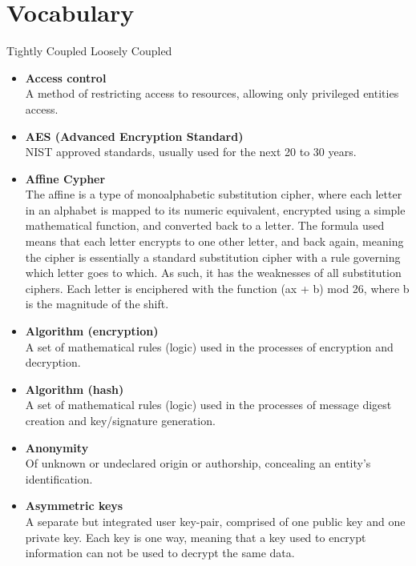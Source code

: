\newpage
\section{Vocabulary}

Tightly Coupled
Loosely Coupled

\begin{itemize}
\item \textbf{Access control}\\
A method of restricting access to resources, allowing only privileged entities access.

\item \textbf{AES (Advanced Encryption Standard)}\\
NIST approved standards, usually used for the next 20 to 30 years.

\item \textbf{Affine Cypher}\\
The affine is a type of monoalphabetic substitution cipher, where each letter in an alphabet is mapped to its numeric equivalent, encrypted using a simple mathematical function, and converted back to a letter. The formula used means that each letter encrypts to one other letter, and back again, meaning the cipher is essentially a standard substitution cipher with a rule governing which letter goes to which. As such, it has the weaknesses of all substitution ciphers. Each letter is enciphered with the function (ax + b) mod 26, where b is the magnitude of the shift.

\item \textbf{Algorithm (encryption)}\\
A set of mathematical rules (logic) used in the processes of encryption and decryption.

\item \textbf{Algorithm (hash)}\\
A set of mathematical rules (logic) used in the processes of message digest creation and key/signature generation.

\item \textbf{Anonymity}\\
Of unknown or undeclared origin or authorship, concealing an entity’s identification.

\item \textbf{Asymmetric keys}\\
A separate but integrated user key-pair, comprised of one public key and one private key. Each key is one way, meaning that a key used to encrypt information can not be used to decrypt the same data.


\end{itemize}

